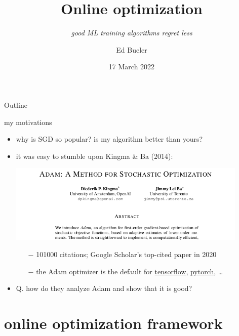 \documentclass[xcolor={svgnames},
               hyperref={colorlinks,citecolor=DeepPink4,linkcolor=FireBrick,urlcolor=Maroon},
               usepdftitle=false]  %
               {beamer}
\title[Online optimization]{Online optimization}
\subtitle{\emph{good ML training algorithms regret less}}
\author{Ed Bueler}
\institute[UAF]{MATH 692 Mathematics for Machine Learning}
\date[]{17 March 2022}
\begin{document}
\beamertemplatenavigationsymbolsempty

\begin{frame}
  \maketitle
\end{frame}


\begin{frame}{Outline}
  \tableofcontents[hideallsubsections]
\end{frame}


\begin{frame}{my motivations}

\begin{itemize}
\item why is SGD so popular? is my algorithm better than yours?

\medskip
\item it was easy to stumble upon Kingma \& Ba (2014):

\medskip
\begin{center}
\includegraphics[width=0.9\textwidth]{figs/adam-paper.png}
\end{center}

\medskip
    \begin{itemize}
    \item[$-$] 101000 citations; Google Scholar's top-cited paper in 2020
    \item[$-$] the Adam optimizer is the default for \href{https://www.tensorflow.org/tutorials/keras/classification}{tensorflow}, \href{https://pytorch.org/docs/stable/optim.html}{pytorch}, \dots
    \end{itemize}

\medskip
\item \alert{Q.} how do they analyze Adam and show that it is good?
\end{itemize}
\end{frame}


\section{online optimization framework}
\end{document}
